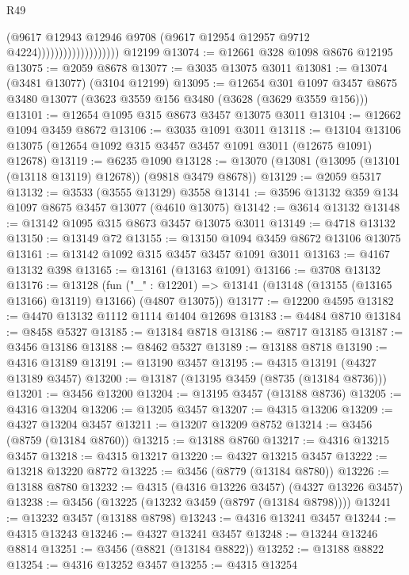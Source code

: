 \begin{lexlean}{R49}
\begin{coremodule}
                                      (@9617
                                        @12943
                                        @12946
                                        @9708
                                        (@9617 @12954 @12957 @9712 @4224)))))))))))))))))))
    @12199
@13074 := @12661 @328 @1098 @8676 @12195
@13075 := @2059 @8678
@13077 := @3035 @13075 @3011
@13081 := @13074 (@3481 @13077) (@3104 @12199)
@13095 := @12654
    @301
    @1097
    @3457
    @8675
    @3480
    @13077
    (@3623 @3559 @156 @3480 (@3628 (@3629 @3559 @156)))
@13101 := @12654 @1095 @315 @8673 @3457 @13075 @3011
@13104 := @12662 @1094 @3459 @8672
@13106 := @3035 @1091 @3011
@13118 := @13104 @13106 @13075 (@12654 @1092 @315 @3457 @3457 @1091 @3011 (@12675 @1091) @12678)
@13119 := @6235 @1090
@13128 := @13070 (@13081 (@13095 (@13101 (@13118 @13119) @12678)) (@9818 @3479 @8678))
@13129 := @2059 @5317
@13132 := @3533 (@3555 @13129) @3558
@13141 := @3596 @13132 @359 @134 @1097 @8675 @3457 @13077 (@4610 @13075)
@13142 := @3614 @13132
@13148 := @13142 @1095 @315 @8673 @3457 @13075 @3011
@13149 := @4718 @13132
@13150 := @13149 @72
@13155 := @13150 @1094 @3459 @8672 @13106 @13075
@13161 := @13142 @1092 @315 @3457 @3457 @1091 @3011
@13163 := @4167 @13132 @398
@13165 := @13161 (@13163 @1091)
@13166 := @3708 @13132
@13176 := @13128
    (fun ("_" : @12201) => @13141 (@13148 (@13155 (@13165 @13166) @13119) @13166) (@4807 @13075))
@13177 := @12200 @4595
@13182 := @4470 @13132 @1112 @1114 @1404 @12698
@13183 := @4484 @8710
@13184 := @8458 @5327
@13185 := @13184 @8718
@13186 := @8717 @13185
@13187 := @3456 @13186
@13188 := @8462 @5327
@13189 := @13188 @8718
@13190 := @4316 @13189
@13191 := @13190 @3457
@13195 := @4315 @13191 (@4327 @13189 @3457)
@13200 := @13187 (@13195 @3459 (@8735 (@13184 @8736)))
@13201 := @3456 @13200
@13204 := @13195 @3457 (@13188 @8736)
@13205 := @4316 @13204
@13206 := @13205 @3457
@13207 := @4315 @13206
@13209 := @4327 @13204 @3457
@13211 := @13207 @13209 @8752
@13214 := @3456 (@8759 (@13184 @8760))
@13215 := @13188 @8760
@13217 := @4316 @13215 @3457
@13218 := @4315 @13217
@13220 := @4327 @13215 @3457
@13222 := @13218 @13220 @8772
@13225 := @3456 (@8779 (@13184 @8780))
@13226 := @13188 @8780
@13232 := @4315 (@4316 @13226 @3457) (@4327 @13226 @3457)
@13238 := @3456 (@13225 (@13232 @3459 (@8797 (@13184 @8798))))
@13241 := @13232 @3457 (@13188 @8798)
@13243 := @4316 @13241 @3457
@13244 := @4315 @13243
@13246 := @4327 @13241 @3457
@13248 := @13244 @13246 @8814
@13251 := @3456 (@8821 (@13184 @8822))
@13252 := @13188 @8822
@13254 := @4316 @13252 @3457
@13255 := @4315 @13254

\end{coremodule}
\end{lexlean}
